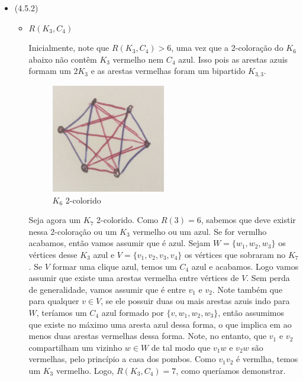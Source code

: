 \documentclass{article}
\begin{document}
\begin{itemize}
\begin{itemize}
	      \end{itemize}

	\item (4.5.2)

	      \begin{itemize}
		      \item \(R(K_3, C_4)\)

		            Inicialmente, note que \(R(K_3, C_4) > 6\), uma vez que a 2-coloração do \(K_6\) abaixo não contêm \(K_3\) vermelho nem
		            \(C_4\) azul. Isso pois as arestas azuis formam um \(2 K_3\) e as arestas vermelhas foram um bipartido \(K_{3, 3}\).


		            \begin{figure}[H]
			            \centering
			            \includegraphics[width=0.5\textwidth]{images/k6.jpeg}
			            \caption{\(K_6\) 2-colorido}
		            \end{figure}

		            Seja agora um \(K_7\) 2-colorido. Como \(R(3) = 6\), sabemos que deve existir nessa 2-coloração ou um \(K_3\) vermelho ou um azul. Se for vermlho acabamos,
		            então vamos assumir que é azul. Sejam \(W = \{w_1, w_2, w_3\}\) os vértices desse \(K_3\) azul e \( V = \{v_1, v_2, v_3, v_4\}\) os vértices que sobraram no \(K_7\). Se \(V\) formar
		            uma clique azul, temos um \(C_4\) azul e acabamos. Logo vamos assumir que existe uma arestas vermelha entre vértices de \(V\). Sem perda de generalidade, vamos assumir
		            que é entre \(v_1\) e \(v_2\). Note também que para qualquer \(v \in V\), se ele possuir duas ou mais arestas azuis indo para \(W\), teríamos um \(C_4\)
		            azul formado por \(\{v, w_1, w_2, w_3\}\), então assumimos que existe no máximo uma aresta azul dessa forma, o que implica em ao menos duas arestas vermelhas
		            dessa forma. Note, no entanto, que \(v_1\) e \(v_2\) compartilham um vizinho \(w \in W\) de tal modo que \(v_1w\) e \(v_2w\) são vermelhas,
		            pelo princípio a casa dos pombos. Como \(v_1v_2\) é vermlha, temos um \(K_3\) vermelho. Logo, \(R(K_3, C_4) = 7\), como queríamos demonstrar.


\end{itemize}
\end{itemize}
\end{document}
